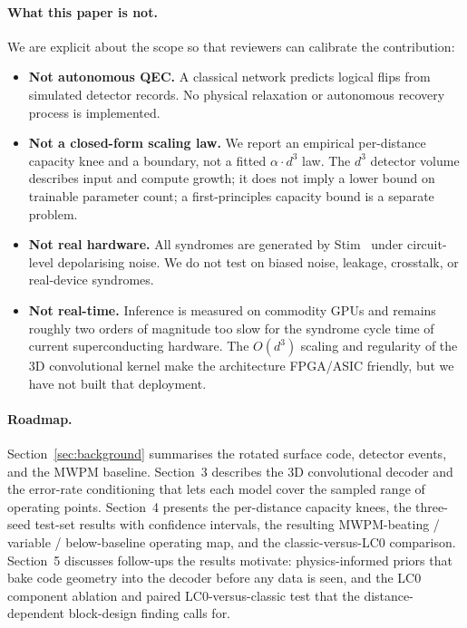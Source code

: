 \documentclass[11pt,a4paper]{article}
\begin{document}
\paragraph{What this paper is not.}
We are explicit about the scope so that reviewers can calibrate the
contribution:
\begin{itemize}[nosep]
  \item \textbf{Not autonomous QEC.} A classical network predicts logical
        flips from simulated detector records. No physical relaxation or
        autonomous recovery process is implemented.
  \item \textbf{Not a closed-form scaling law.} We report an empirical
        per-distance capacity knee and a boundary, not a fitted
        $\alpha \cdot d^{3}$ law. The $d^{3}$ detector volume describes input and compute growth;
        it does not imply a lower bound on trainable parameter count; a first-principles capacity bound is a separate problem.
  \item \textbf{Not real hardware.} All syndromes are generated by
        Stim~\cite{gidney2021stim} under circuit-level depolarising
        noise. We do not test on biased noise, leakage, crosstalk, or
        real-device syndromes.
  \item \textbf{Not real-time.} Inference is measured on commodity GPUs
        and remains roughly two orders of magnitude too slow for the
        syndrome cycle time of current superconducting hardware. The
        $O(d^{3})$ scaling and regularity of the 3D convolutional
        kernel make the architecture FPGA/ASIC friendly, but we have
        not built that deployment.
\end{itemize}

\paragraph{Roadmap.}
Section~\ref{sec:background} summarises the rotated
surface code, detector events, and the MWPM baseline. Section~3
describes the 3D convolutional decoder and the error-rate conditioning
that lets each model cover the sampled range of operating points.
Section~4 presents the per-distance capacity knees, the three-seed
test-set results with confidence intervals, the resulting
MWPM-beating / variable / below-baseline operating map, and the
classic-versus-LC0 comparison. Section~5 discusses follow-ups the results
motivate: physics-informed priors that bake code geometry into the decoder
before any data is seen, and the LC0 component ablation and paired
LC0-versus-classic test that the distance-dependent block-design finding
calls for.
\end{document}

